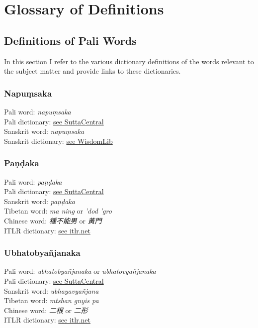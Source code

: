 \section{Glossary of Definitions}
\label{appendix3}

\subsection{Definitions of Pali Words}
In this section I refer to the various dictionary definitions of the words relevant to the subject matter and provide links to these dictionaries.

\subsubsection{Napuṃsaka}
Pali word: {\em napuṃsaka} \\
Pali dictionary: \href{https://suttacentral.net/define/napu%E1%B9%83saka}{see SuttaCentral} \\
Sanskrit word: {\em napuṃsaka} \\
Sanskrit dictionary: \href{https://www.wisdomlib.org/definition/napumsaka}{see WisdomLib} \\

\subsubsection{Paṇḍaka}
Pali word: {\em paṇḍaka} \\
Pali dictionary: \href{https://suttacentral.net/define/pa%E1%B9%87%E1%B8%8Daka}{see SuttaCentral} \\
Sanskrit word: {\em paṇḍaka} \\
Tibetan word: {\em ma ning} or {\em ’dod ’gro} \\
Chinese word: {\em 種不能男} or {\em 黃門}\\
ITLR dictionary: \href{http://www.itlr.net/hwid:281142}{see itlr.net} \\

\subsubsection{Ubhatob­yañ­janaka}
Pali word: {\em ubhatob­yañ­janaka} or {\em ubhatovyañ­janaka} \\
Pali dictionary: \href{https://suttacentral.net/define/ubhatovya%C3%B1janaka}{see SuttaCentral} \\
Sanskrit word: {\em ubhayavyañjana} \\
Tibetan word: {\em mtshan gnyis pa} \\
Chinese word: {\em 二根} or {\em 二形}\\
ITLR dictionary: \href{http://www.itlr.net/hwid:62844}{see itlr.net} \\

